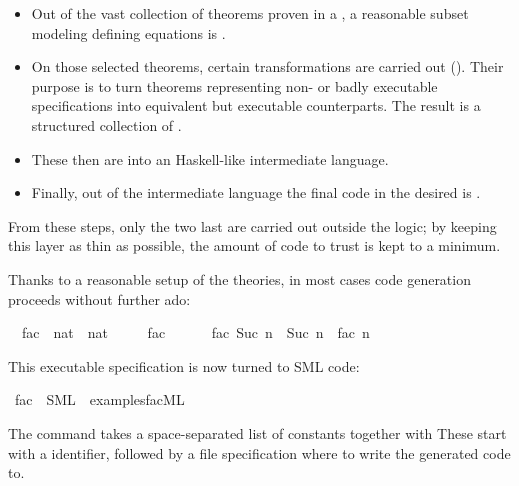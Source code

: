 \begin{isabellebody}
\begin{isamarkuptext}
\begin{itemize}
    \item Out of the vast collection of theorems proven in a
      , a reasonable subset modeling
      defining equations is .

    \item On those selected theorems, certain
      transformations are carried out
      ().  Their purpose is to turn theorems
      representing non- or badly executable
      specifications into equivalent but executable counterparts.
      The result is a structured collection of .

    \item These  then are 
      into an Haskell-like intermediate
      language.

    \item Finally, out of the intermediate language the final
      code in the desired  is .

  \end{itemize}

  From these steps, only the two last are carried out
  outside the logic; by keeping this layer as
  thin as possible, the amount of code to trust is
  kept to a minimum.%
\end{isamarkuptext}%
\isamarkuptrue%
%
\isamarkuptrue%
%
\isamarkuptrue%
%
\begin{isamarkuptext}%
Thanks to a reasonable setup of the  theories, in
  most cases code generation proceeds without further ado:%
\end{isamarkuptext}%
\isamarkuptrue%
\isamarkupfalse%
\isanewline
\ \ fac\ {\isacharcolon}{\isacharcolon}\ {\isachardoublequoteopen}nat\ {\isasymRightarrow}\ nat{\isachardoublequoteclose}\ \isanewline
\ \ \ \ {\isachardoublequoteopen}fac\ {}\ {\isacharequal}\ {}{\isachardoublequoteclose}\isanewline
\ \ {\isacharbar}\ {\isachardoublequoteopen}fac\ {\isacharparenleft}Suc\ n{\isacharparenright}\ {\isacharequal}\ Suc\ n\ {\isacharasterisk}\ fac\ n{\isachardoublequoteclose}%
\begin{isamarkuptext}%
\noindent This executable specification is now turned to SML code:%
\end{isamarkuptext}%
\isamarkuptrue%
\isamarkupfalse%
\ fac\ \ SML\ \ {\isachardoublequoteopen}examples{\isacharslash}fac{\isachardot}ML{\isachardoublequoteclose}%
\begin{isamarkuptext}%
\noindent  The \isa{{\isasymEXPORTCODE}} command takes a space-separated list of
  constants together with 
  These start with a 
  identifier, followed by a file specification
  where to write the generated code to.


\end{isamarkuptext}
\end{isabellebody}
